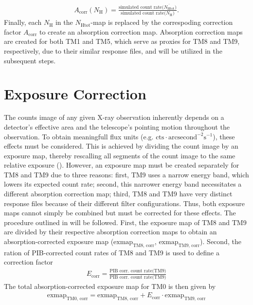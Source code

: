 \begin{align*}
    A_{\text{corr}}(N_\text{H}) = \frac{\text{simulated count rate}\bigl(\overline{N_{\text{Htot}}}\bigr)}{\text{simulated count rate}\bigl(N_\text{H}\bigr)}.
\end{align*}
Finally, each \(\textstyle{N_\text{H}}\) in the \({\textstyle N_\text{Htot}}\)-map is replaced by the correspoding correction factor \(A_\text{corr}\) to create an absorption correction map. Absorption correction maps are created for both TM1 and TM5, which serve as proxies for TM8 and TM9, respectively, due to their similar response files, and will be utilized in the subsequent steps.
\section{Exposure Correction}
The counts image of any given X-ray observation inherently depends on a detector's effective area and the telescope's pointing motion throughout the observation. To obtain meaningfull flux units (e.g. \(\text{cts}\cdot\text{arcsecond}^{-2}\text{s}^{-1}\)), these effects must be considered. This is achieved by dividing the count image by an exposure map, thereby rescalling all segments of the count image to the same relative exposure (\cite{davis2001formal}). However, an exposure map must be created separately for TM8 and TM9 due to three reasons: first, TM9 uses a narrow energy band, which lowers its expected count rate; second, this narrower energy band necessitates a different absorption correction map; third, TM8 and TM9 have very distinct response files because of their different filter configurations. Thus, both exposure maps cannot simply be combined but must be corrected for these effects. The procedure outlined in \cite{Reiprich2021} will be followed. First, the exposure map of TM8 and TM9 are divided by their respective absorption correction maps to obtain an absorption-corrected exposure map (\(\text{exmap}_\text{TM8, corr}\), \(\text{exmap}_\text{TM9, corr}\)). Second, the ration of PIB-corrected count rates of TM8 and TM9 is used to define a correction factor 
\begin{align*}
    E_\text{corr} = \frac{\text{PIB corr. count rate(TM9)}}{\text{PIB corr. count rate(TM9)}}
\end{align*}
The total absorption-corrected exposure map for TM0 is then given by
\begin{align*}
    \text{exmap}_\text{TM0, corr} = \text{exmap}_\text{TM8, corr} + E_\text{corr}\cdot\text{exmap}_\text{TM9, corr} 
\end{align*}
